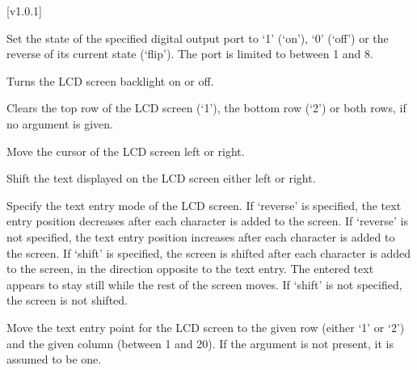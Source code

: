 [v1.0.1]




\pluginItemCommands[]

  \pluginListCmdBegin

  Set the state of the specified digital output port to `1' (`on'), `0' (`off') or the reverse of its current state (`flip').
  The port is limited to between 1 and 8.

  Turns the LCD screen backlight on or off.

  Clears the top row of the LCD screen (`1'), the bottom row (`2') or both rows, if no argument is given.

  Move the cursor of the LCD screen left or right.

  Shift the text displayed on the LCD screen either left or right.

  Specify the text entry mode of the LCD screen.
  If `reverse' is specified, the text entry position decreases after each character is added to the screen.
  If `reverse' is not specified, the text entry position increases after each character is added to the screen.
  If `shift' is specified, the screen is shifted after each character is added to the screen,
  in the direction opposite to the text entry.
  The entered text appears to stay still while the rest of the screen moves.
  If `shift' is not specified, the screen is not shifted.
  
  Move the text entry point for the LCD screen to the given row (either `1' or `2') and the given column (between 1 and 20).
  If the argument  is not present, it is assumed to be one.

